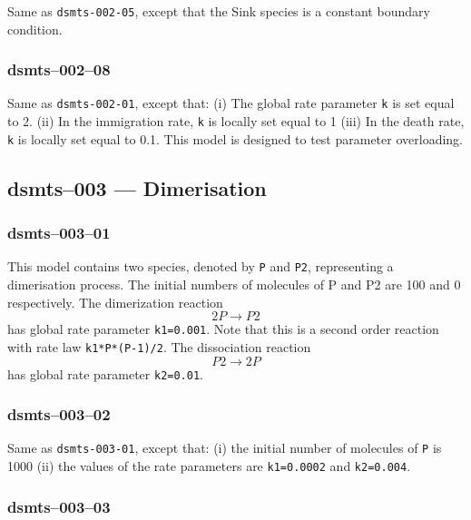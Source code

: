  Same as \verb$dsmts-002-05$,
except that the Sink species is a constant boundary condition. 


\subsubsection{dsmts--002--08}

Same as \verb$dsmts-002-01$, except that: (i) The global rate parameter \verb$k$ is set
equal to 2. (ii) In the immigration rate, \verb$k$ is locally set equal to 1
(iii) In the death rate, \verb$k$ is locally set equal to 0.1. This model is
designed to test parameter overloading. 


\subsection{dsmts--003 ---
Dimerisation }

\subsubsection{dsmts--003--01}

 This model contains two species, denoted by \verb$P$ and
\verb$P2$, representing a dimerisation process. The initial numbers of
molecules of P and P2 are 100 and 0 respectively. The dimerization
reaction
\[
2P \longrightarrow P2
\]
 has global rate
parameter \verb$k1=0.001$. Note that this is a second order reaction with
rate law \verb$k1*P*(P-1)/2$. The dissociation reaction 
\[
P2 \longrightarrow 2P
\] has global rate
parameter \verb$k2=0.01$. 


\subsubsection{dsmts--003--02}

 Same as \verb$dsmts-003-01$, except that: (i) the initial
number of molecules of \verb$P$ is 1000 (ii) the values of the rate
parameters are \verb$k1=0.0002$ and \verb$k2=0.004$. 


\subsubsection{dsmts--003--03}

